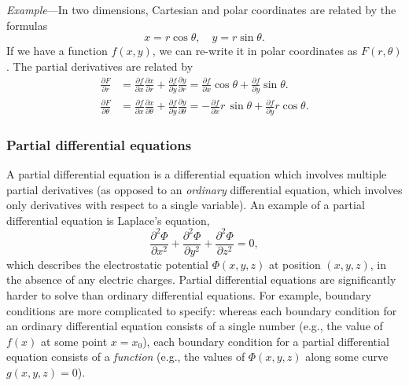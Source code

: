 \documentclass[10pt,a4paper]{article}
\begin{document}
\begin{framed}\noindent
\textit{Example}---In two dimensions, Cartesian and polar coordinates are related by the
formulas
\begin{equation*}
  x = r\cos\theta, \quad y = r\sin\theta.
\end{equation*}
If we have a function $f(x,y)$, we can re-write it in polar
coordinates as $F(r,\theta)$.  The partial derivatives are related
by
\begin{align*}
  \frac{\partial F}{\partial r} &= \frac{\partial
  f}{\partial x} \frac{\partial x}{\partial r} + \frac{\partial
  f}{\partial y} \frac{\partial y}{\partial r} = \frac{\partial
  f}{\partial x} \cos\theta + \frac{\partial f}{\partial y}
  \sin\theta. \\
  \frac{\partial F}{\partial \theta} &= \frac{\partial
  f}{\partial x} \frac{\partial x}{\partial \theta} + \frac{\partial
  f}{\partial y} \frac{\partial y}{\partial \theta} = -\frac{\partial
  f}{\partial x} r\,\sin\theta + \frac{\partial f}{\partial y}
  r\cos\theta.
\end{align*}
\end{framed}

\subsubsection{Partial differential equations}
\label{partial-differential-equations}

A partial differential equation is a differential equation which
involves multiple partial derivatives (as opposed to an \emph{ordinary}
differential equation, which involves only derivatives with respect to a
single variable). An example of a partial differential equation is
Laplace's equation,
\begin{equation}
\frac{\partial^2 \Phi}{\partial x^2} + \frac{\partial^2 \Phi}{\partial y^2} + \frac{\partial^2 \Phi}{\partial z^2}= 0,
\end{equation}
which describes the electrostatic potential $\Phi(x,y,z)$ at position
$(x,y,z)$, in the absence of any electric charges. Partial
differential equations are significantly harder to solve than ordinary
differential equations. For example, boundary conditions are more
complicated to specify: whereas each boundary condition for an ordinary
differential equation consists of a single number (e.g., the value of
$f(x)$ at some point $x = x_0$), each boundary condition for a
partial differential equation consists of a \emph{function} (e.g., the
values of $\Phi(x,y,z)$ along some curve $g(x,y,z) = 0$).
\end{document}
